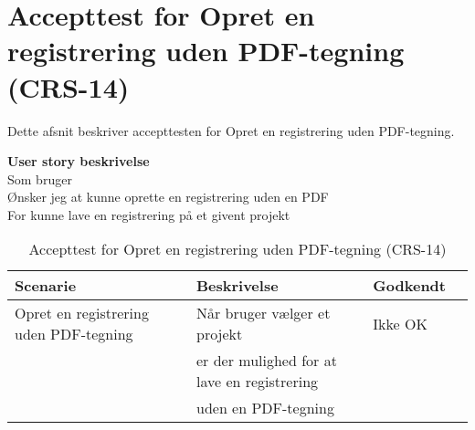 \section{Accepttest for Opret en registrering uden PDF-tegning (CRS-14)}
Dette afsnit beskriver accepttesten for Opret en registrering uden PDF-tegning.

\textbf{User story beskrivelse} \\
Som bruger \\
Ønsker jeg at kunne oprette en registrering uden en PDF  \\
For kunne lave en registrering på et givent projekt

\begin{table}[H]
	\centering
	\begin{tabular}{|ll|l|ll|} \hline
		\textbf{Scenarie} &  & \textbf{Beskrivelse}&  \textbf{Godkendt}&  \\ \hline
		Opret en registrering uden PDF-tegning&  &  Når bruger vælger et projekt &  Ikke OK&  \\
		& & er der mulighed for at lave en registrering& & \\ 
			& & uden en PDF-tegning& & \\ \hline
	\end{tabular}
	\caption{Accepttest for Opret en registrering uden PDF-tegning (CRS-14)}
	\label{AcceptUdenPDF}
\end{table}

\clearpage